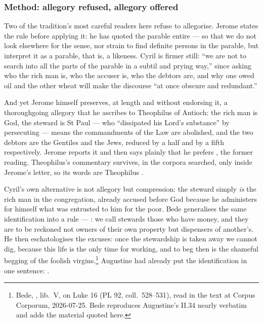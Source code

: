 \subsubsection*{Method: allegory refused, allegory offered}

Two of the tradition's most careful readers here refuse to allegorise. Jerome
states the rule before applying it: he has quoted the parable entire 
--- so that we do not look elsewhere for the sense, nor strain to find definite
persons in the parable, but interpret it as a parable, that is, a likeness.
Cyril is firmer still: ``we are not to search into all the parts of the parable
in a subtil and prying way,'' since asking who the rich man is, who the accuser
is, who the debtors are, and why one owed oil and the other wheat will make the
discourse ``at once obscure and redundant.''

And yet Jerome himself preserves, at length and without endorsing it, a
thoroughgoing allegory that he ascribes to Theophilus of Antioch: the rich man
is God, the steward is St Paul --- who ``dissipated his Lord's substance'' by
persecuting ---  means the commandments of the Law are
abolished, and the two debtors are the Gentiles and the Jews, reduced by a half
and by a fifth respectively. Jerome reports it and then says plainly that he
prefers , the former reading. Theophilus's
commentary survives, in the corpora searched, only inside Jerome's letter, so
its words are Theophilus .

Cyril's own alternative is not allegory but compression: the steward simply
\emph{is} the rich man in the congregation, already accused before God because
he administers for himself what was entrusted to him for the poor. Bede
generalises the same identification into a rule --- : we call stewards those who have money, and they
are to be reckoned not owners of their own property but dispensers of another's.
He then eschatologises the excuses: once the stewardship is taken away we cannot
dig, because this life is the only time for working, and to beg then is the
shameful begging of the foolish virgins.\footnote{Bede, , lib.\ V, on Luke 16 (PL 92, coll.\ 528--531), read in the
 text at Corpus Corporum, 2026-07-25. Bede reproduces
Augustine's  II.34 nearly verbatim and adds the material
quoted here.} Augustine had already put the identification in one sentence:
.

